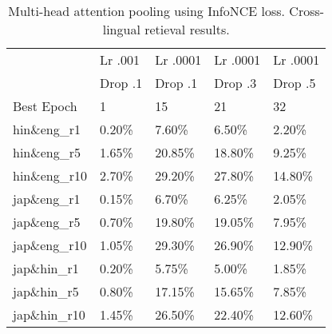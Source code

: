 \begin{table}
    \centering
\begin{tabular}{lllll}
\toprule
{} & Lr .001 & Lr .0001 & Lr .0001 & Lr .0001 \\
{} & Drop .1 & Drop .1 & Drop .3 & Drop .5 \\
\midrule
Best Epoch          &                          1 &                                  15 &                     21 &                     32 \\
\midrule
hin\&eng\_r1  &                      0.20\% &                               7.60\% &                  6.50\% &                  2.20\% \\
hin\&eng\_r5  &                      1.65\% &                              20.85\% &                 18.80\% &                  9.25\% \\
hin\&eng\_r10 &                      2.70\% &                              29.20\% &                 27.80\% &                 14.80\% \\
\midrule
jap\&eng\_r1  &                      0.15\% &                               6.70\% &                  6.25\% &                  2.05\% \\
jap\&eng\_r5  &                      0.70\% &                              19.80\% &                 19.05\% &                  7.95\% \\
jap\&eng\_r10 &                      1.05\% &                              29.30\% &                 26.90\% &                 12.90\% \\
\midrule
jap\&hin\_r1  &                      0.20\% &                               5.75\% &                  5.00\% &                  1.85\% \\
jap\&hin\_r5  &                      0.80\% &                              17.15\% &                 15.65\% &                  7.85\% \\
jap\&hin\_r10 &                      1.45\% &                              26.50\% &                 22.40\% &                 12.60\% \\

\bottomrule
\end{tabular}

\caption{Multi-head attention pooling using InfoNCE loss. Cross-lingual retieval results.}
\label{table:mh_attn_hparams_cling}
\end{table}
